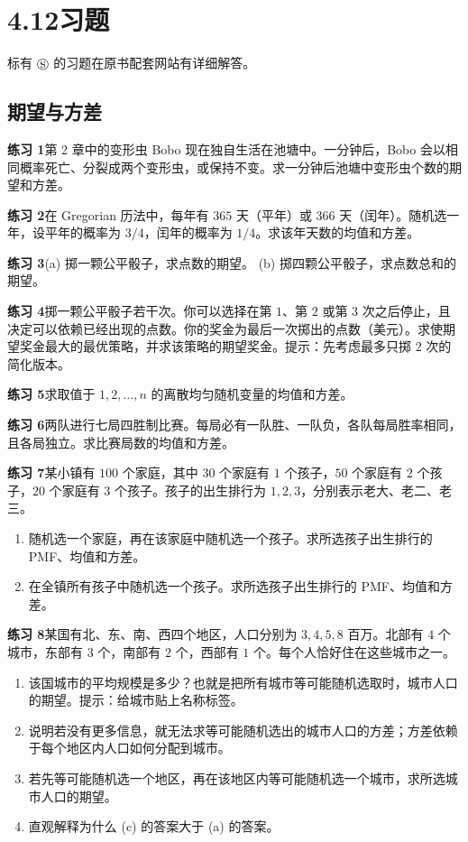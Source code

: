 \documentclass[UTF8,12pt,a4paper,fontset=fandol]{ctexart}
\begin{document}
\section*{4.12\quad 习题}

标有 $\circledS$ 的习题在原书配套网站有详细解答。

\subsection*{期望与方差}

\noindent\textbf{练习 1}\quad 第 2 章中的变形虫 Bobo 现在独自生活在池塘中。一分钟后，Bobo 会以相同概率死亡、分裂成两个变形虫，或保持不变。求一分钟后池塘中变形虫个数的期望和方差。

\noindent\textbf{练习 2}\quad 在 Gregorian 历法中，每年有 $365$ 天（平年）或 $366$ 天（闰年）。随机选一年，设平年的概率为 $3/4$，闰年的概率为 $1/4$。求该年天数的均值和方差。

\noindent\textbf{练习 3}\quad (a) 掷一颗公平骰子，求点数的期望。 (b) 掷四颗公平骰子，求点数总和的期望。

\noindent\textbf{练习 4}\quad 掷一颗公平骰子若干次。你可以选择在第 $1$、第 $2$ 或第 $3$ 次之后停止，且决定可以依赖已经出现的点数。你的奖金为最后一次掷出的点数（美元）。求使期望奖金最大的最优策略，并求该策略的期望奖金。提示：先考虑最多只掷 $2$ 次的简化版本。

\noindent\textbf{练习 5}\quad 求取值于 $1,2,\ldots,n$ 的离散均匀随机变量的均值和方差。

\noindent\textbf{练习 6}\quad 两队进行七局四胜制比赛。每局必有一队胜、一队负，各队每局胜率相同，且各局独立。求比赛局数的均值和方差。

\noindent\textbf{练习 7}\quad 某小镇有 $100$ 个家庭，其中 $30$ 个家庭有 $1$ 个孩子，$50$ 个家庭有 $2$ 个孩子，$20$ 个家庭有 $3$ 个孩子。孩子的出生排行为 $1,2,3$，分别表示老大、老二、老三。
\begin{enumerate}
  \item[(a)] 随机选一个家庭，再在该家庭中随机选一个孩子。求所选孩子出生排行的 PMF、均值和方差。
  \item[(b)] 在全镇所有孩子中随机选一个孩子。求所选孩子出生排行的 PMF、均值和方差。
\end{enumerate}

\noindent\textbf{练习 8}\quad 某国有北、东、南、西四个地区，人口分别为 $3,4,5,8$ 百万。北部有 $4$ 个城市，东部有 $3$ 个，南部有 $2$ 个，西部有 $1$ 个。每个人恰好住在这些城市之一。
\begin{enumerate}
  \item[(a)] 该国城市的平均规模是多少？也就是把所有城市等可能随机选取时，城市人口的期望。提示：给城市贴上名称标签。
  \item[(b)] 说明若没有更多信息，就无法求等可能随机选出的城市人口的方差；方差依赖于每个地区内人口如何分配到城市。
  \item[(c)] 若先等可能随机选一个地区，再在该地区内等可能随机选一个城市，求所选城市人口的期望。
  \item[(d)] 直观解释为什么 (c) 的答案大于 (a) 的答案。
\end{enumerate}
\end{document}
